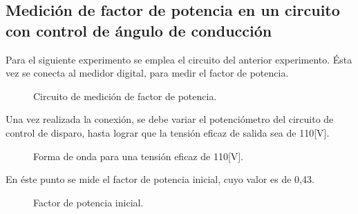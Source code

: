   \subsection{Medición de factor de potencia en un circuito con control de ángulo de conducción}

Para el siguiente experimento se emplea el circuito del anterior 
experimento. Ésta vez se conecta al medidor digital, para medir 
el factor de potencia.

\begin{figure}[H]
  \centering
  \caption{Circuito de medición de factor de potencia.}
  \label{fig:CircuitoMideFDP}
\end{figure}

Una vez realizada la conexión, se debe variar el potenciómetro del circuito 
de control de disparo, hasta lograr que la tensión eficaz de 
salida sea de 110[V].

\begin{figure}[H]
  \centering
  \caption{Forma de onda para una tensión eficaz de 110[V].}
  \label{fig:SeñalExp3}
\end{figure}

 En éste punto se mide el factor de potencia inicial, 
 cuyo valor es de 0,43.

 \begin{figure}[H]
  \centering
  \caption{Factor de potencia inicial.}
  \label{fig:FDPExp3}
\end{figure}

